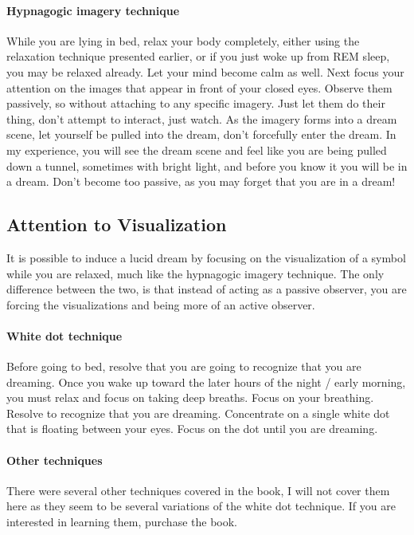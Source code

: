 \documentclass{article}
\begin{document}
\paragraph{Hypnagogic imagery technique} While you are lying in bed, relax your body completely, either using the relaxation technique presented earlier, or if you just woke up from REM sleep, you may be relaxed already. Let your mind become calm as well. Next focus your attention on the images that appear in front of your closed eyes. Observe them passively, so without attaching to any specific imagery. Just let them do their thing, don't attempt to interact, just watch. As the imagery forms into a dream scene, let yourself be pulled into the dream, don't forcefully enter the dream. In my experience, you will see the dream scene and feel like you are being pulled down a tunnel, sometimes with bright light, and before you know it you will be in a dream. Don't become too passive, as you may forget that you are in a dream!

\subsection{Attention to Visualization}
It is possible to induce a lucid dream by focusing on the visualization of a symbol while you are relaxed, much like the hypnagogic imagery technique. The only difference between the two, is that instead of acting as a passive observer, you are forcing the visualizations and being more of an active observer.

\paragraph{White dot technique} Before going to bed, resolve that you are going to recognize that you are dreaming. Once you wake up toward the later hours of the night / early morning, you must relax and focus on taking deep breaths. Focus on your breathing. Resolve to recognize that you are dreaming. Concentrate on a single white dot that is floating between your eyes. Focus on the dot until you are dreaming. 


\paragraph{Other techniques} There were several other techniques covered in the book, I will not cover them here as they seem to be several variations of the white dot technique. If you are interested in learning them, purchase the book.
\end{document}
